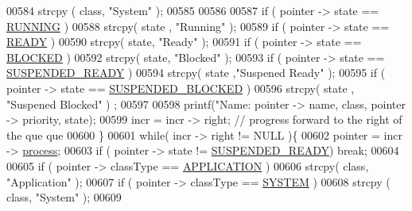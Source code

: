 \begin{DoxyCode}
{{{00584                         strcpy ( \textcolor{keyword}{class}, \textcolor{stringliteral}{"System"} );
00585                 
00586                 
00587                 \textcolor{keywordflow}{if} ( pointer -> state == \hyperlink{mpx__r2_8h_a6fb7181d994ee98e735494be55809708}{RUNNING} ) 
00588                         strcpy( state , \textcolor{stringliteral}{"Running"} );
00589                 \textcolor{keywordflow}{if} ( pointer -> state == \hyperlink{mpx__r2_8h_ad1235d5ce36f7267285e82dccd428aa6}{READY} ) 
00590                         strcpy( state, \textcolor{stringliteral}{"Ready"} );
00591                 \textcolor{keywordflow}{if} ( pointer -> state == \hyperlink{mpx__r2_8h_a48f6457243719e7031768d4100741159}{BLOCKED} ) 
00592                         strcpy( state, \textcolor{stringliteral}{"Blocked"} );
00593                 \textcolor{keywordflow}{if} ( pointer -> state == \hyperlink{mpx__r2_8h_a07b1141143e8825b04670da23fca8cc7}{SUSPENDED_READY} ) 
00594                         strcpy( state ,\textcolor{stringliteral}{"Suspened Ready"} );
00595                 \textcolor{keywordflow}{if} ( pointer -> state == \hyperlink{mpx__r2_8h_a6e41bb5a80c5049e8d364bab8ee4d73a}{SUSPENDED_BLOCKED} ) 
00596                         strcpy( state , \textcolor{stringliteral}{"Suspened Blocked"} ) ;
00597                 
00598                 printf(\textcolor{stringliteral}{"Name: %
      pointer -> name, \textcolor{keyword}{class}, pointer -> priority, state); 
00599                 incr = incr -> right; \textcolor{comment}{// progress forward to the right of the que
      que}
00600         \}
00601         \textcolor{keywordflow}{while}( incr -> right != NULL )\{
00602                 pointer = incr -> \hyperlink{structprocess}{process};
00603                 \textcolor{keywordflow}{if} ( pointer -> state != \hyperlink{mpx__r2_8h_a07b1141143e8825b04670da23fca8cc7}{SUSPENDED_READY}) \textcolor{keywordflow}{break};
00604                 
00605                 \textcolor{keywordflow}{if} ( pointer -> classType  == \hyperlink{mpx__r2_8h_a796bd7c6ba2e59281760fb155c6287e8}{APPLICATION} )
00606                         strcpy( \textcolor{keyword}{class}, \textcolor{stringliteral}{"Application"} );
00607                 \textcolor{keywordflow}{if} (  pointer -> classType == \hyperlink{mpx__r2_8h_a21b97df85e65556468b28a576311271c}{SYSTEM} )
00608                         strcpy ( \textcolor{keyword}{class}, \textcolor{stringliteral}{"System"} );
00609                 
}}}}
\end{DoxyCode}
